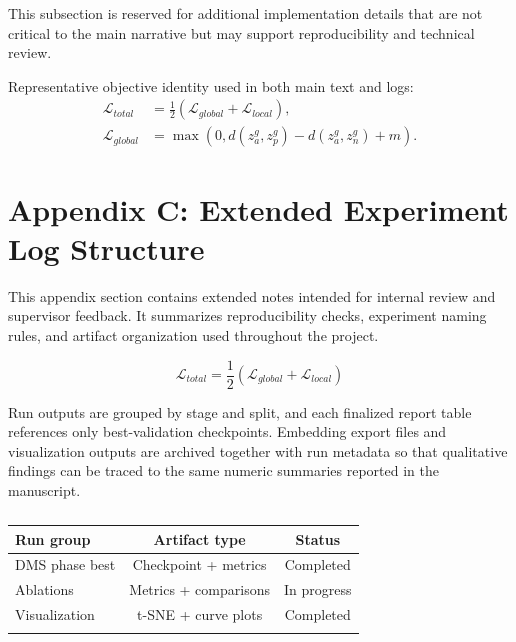 \documentclass[unnumsec,webpdf,contemporary,large]{oup-authoring-template}%
\theoremstyle{thmstyleone}%
\theoremstyle{thmstyletwo}%
\theoremstyle{thmstylethree}%
\begin{document}
\begin{appendices}
This subsection is reserved for additional implementation details that are not critical to the main narrative but may support reproducibility and technical review.


Representative objective identity used in both main text and logs:
\begin{align}
 \mathcal{L}_{total} &= \frac{1}{2}\left(\mathcal{L}_{global}+\mathcal{L}_{local}\right), \label{1eq:hybobo:pfromgH} \\
 \mathcal{L}_{global} &= \max\left(0,d(z_a^g,z_p^g)-d(z_a^g,z_n^g)+m\right). \label{2eq:hybobo:tfromgH}
\end{align}

\section{Appendix C: Extended Experiment Log Structure}\label{sec13}%

This appendix section contains extended notes intended for internal review and supervisor feedback. It summarizes reproducibility checks, experiment naming rules, and artifact organization used throughout the project.

\begin{equation}
\mathcal{L}_{total}=\frac{1}{2}\left(\mathcal{L}_{global}+\mathcal{L}_{local}\right)
\label{eq26}
\end{equation}

Run outputs are grouped by stage and split, and each finalized report table references only best-validation checkpoints. Embedding export files and visualization outputs are archived together with run metadata so that qualitative findings can be traced to the same numeric summaries reported in the manuscript.

\begin{table}
\begin{center}
\begin{minipage}{.52\columnwidth}
\caption{}{%
\begin{tabular}{@{\extracolsep\fill}lcc}%
\toprule
Run group & Artifact type & Status \\
\midrule
DMS phase best & Checkpoint + metrics & Completed \\
Ablations & Metrics + comparisons & In progress \\
Visualization & t-SNE + curve plots & Completed \\
\botrule
\end{tabular}}{}
\end{minipage}
\end{center}
\end{table}

\end{appendices}
\end{document}
